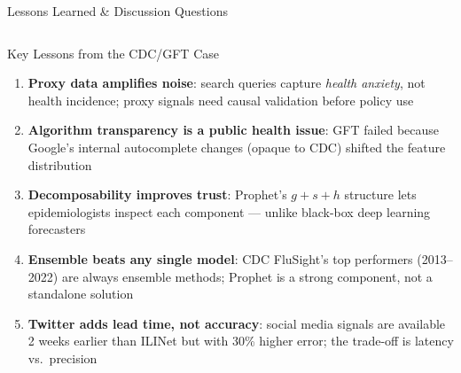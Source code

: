 \documentclass[aspectratio=169,10pt]{beamer}
\begin{document}
\begin{frame}{Lessons Learned \& Discussion Questions}
  \begin{columns}[T]
      \begin{block}{Key Lessons from the CDC/GFT Case}
        \begin{enumerate}
          \item \textbf{Proxy data amplifies noise}:
                search queries capture \emph{health anxiety},
                not health incidence; proxy signals need
                causal validation before policy use
          \item \textbf{Algorithm transparency is a public health issue}:
                GFT failed because Google's internal autocomplete
                changes (opaque to CDC) shifted the feature distribution
          \item \textbf{Decomposability improves trust}:
                Prophet's $g + s + h$ structure lets epidemiologists
                inspect each component — unlike black-box deep
                learning forecasters
          \item \textbf{Ensemble beats any single model}:
                CDC FluSight's top performers (2013--2022) are
                always ensemble methods; Prophet is a strong component,
                not a standalone solution
          \item \textbf{Twitter adds lead time, not accuracy}:
                social media signals are available 2 weeks earlier
                than ILINet but with 30\% higher error;
                the trade-off is latency vs.\ precision
        \end{enumerate}
      \end{block}


\end{columns}
\end{frame}
\end{document}
